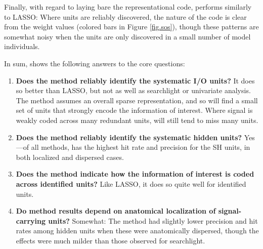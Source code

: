 Finally, with regard to laying bare the representational code, \soslasso performs similarly to LASSO: Where units are reliably discovered, the nature of the code is clear from the weight values (colored bars in Figure \ref{fig.sos}), though these patterns are somewhat noisy when the units are only discovered in a small number of model individuals.

In sum, \soslasso shows the following answers to the core questions: 

\begin{enumerate}
\item {\bf Does the method reliably identify the systematic I/O units?} It does so better than LASSO, but not as well as searchlight or univariate analysis. The method assumes an overall sparse representation, and so will find a small set of units that strongly encode the information of interest. Where signal is weakly coded across many redundant units, \soslasso will still tend to miss many units.
\item {\bf Does the method reliably identify the systematic hidden units?} Yes---of all methods, \soslasso has the highest hit rate and precision for the SH units, in both localized and dispersed cases.
\item {\bf Does the method indicate how the information of interest is coded across identified units?} Like LASSO, it does so quite well for identified units.
\item {\bf Do method results depend on anatomical localization of signal-carrying units?} Somewhat: The method had slightly lower precision and hit rates among hidden units when these were anatomically dispersed, though the effects were much milder than those observed for searchlight.
\end{enumerate}

